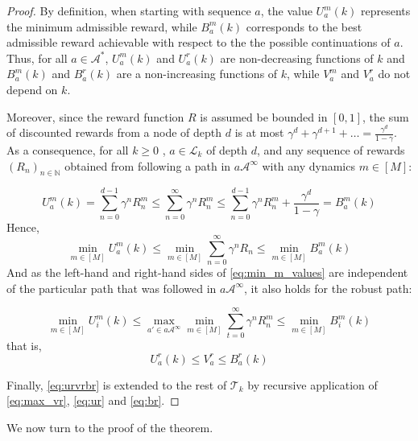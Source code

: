 \documentclass{article}
\begin{document}
\begin{proof}
	By definition, when starting with sequence $a$, the value $U_a^m(k)$ represents the minimum admissible reward, while $B_a^m(k)$ corresponds to the best admissible reward achievable with respect to the the possible continuations of $a$. Thus, for all $a\in\mathcal{A}^*$, $U_a^m(k)$ and $U_a^r(k)$ are non-decreasing functions of $k$ and $B_a^m(k)$ and $B_a^r(k)$ are a non-increasing functions of $k$, while $V_a^m$ and $V_a^r$ do not depend on $k$.
	
	Moreover, since the reward function $R$ is assumed be bounded in $[0, 1]$, the sum of discounted rewards from a node of depth $d$ is at most $\gamma^d + \gamma^{d+1}+\dots = \frac{\gamma^d}{1-\gamma}$. As a consequence, for all $k \geq 0$ , $a\in\mathcal{L}_k$ of depth $d$, and any sequence of rewards $(R_n)_{n\in\mathbb{N}}$ obtained from following a path in $a\mathcal{A}^\infty$ with any dynamics $m \in [M]$:
	
	\begin{equation*}
	U^m_a(k) = \sum_{n=0}^{d-1} \gamma^n R_n^m \leq \sum_{n=0}^\infty \gamma^n R_n^m \leq \sum_{n=0}^{d-1} \gamma^n R_n^m + \frac{\gamma^d}{1-\gamma} = B^m_a(k) 
	\end{equation*}
	Hence,
	\begin{equation}
	\label{eq:min_m_values}
	\min_{m \in [M]} U^m_a(k) \leq \min_{m \in [M]} \sum_{n=0}^\infty \gamma^n R_n \leq \min_{m \in [M]} B^m_a(k)
	\end{equation}
	And as the left-hand and right-hand sides of \eqref{eq:min_m_values} are independent of the particular path that was followed in $a\mathcal{A}^\infty$, it also holds for the robust path:
	
	\begin{equation*}
	\min_{m \in [M]} U^m_i(k) \leq \max_{a'\in a\mathcal{A}^\infty} \min_{m \in [M]} \sum_{t=0}^\infty \gamma^n R_n^m \leq \min_{m \in [M]} B^m_i(k)
	\end{equation*}
	that is,
	\begin{equation}
	\label{eq:urvrbr}
	U^r_a(k) \leq V^r_a  \leq B^r_a(k)
	\end{equation}
	
	Finally, \eqref{eq:urvrbr} is extended to the rest of $\mathcal{T}_k$ by recursive application of \eqref{eq:max_vr}, \eqref{eq:ur} and \eqref{eq:br}.
\end{proof}

We now turn to the proof of the theorem.
\end{document}
